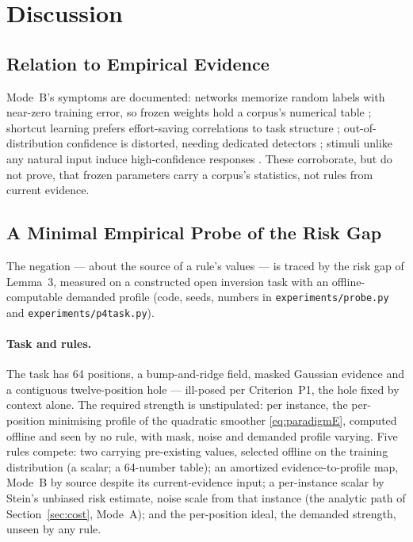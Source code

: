 \section{Discussion}
\label{ch:discussion}

\subsection{Relation to Empirical Evidence}

Mode~B's symptoms are documented: networks memorize random labels with near-zero training error, so frozen weights hold a corpus's numerical table \citep{zhang2021}; shortcut learning prefers effort-saving correlations to task structure \citep{geirhos2020}; out-of-distribution confidence is distorted, needing dedicated detectors \citep{hendrycks2016,yang2024}; stimuli unlike any natural input induce high-confidence responses \citep{nguyen2014}. These corroborate, but do not prove, that frozen parameters carry a corpus's statistics, not rules from current evidence.

\subsection{A Minimal Empirical Probe of the Risk Gap}
\label{sec:probe}

The negation --- about the source of a rule's values --- is traced by the risk gap of Lemma~3, measured on a constructed open inversion task with an offline-computable demanded profile (code, seeds, numbers in \texttt{experiments/probe.py} and \texttt{experiments/p4\ttu task.py}).

\paragraph{Task and rules.} The task has 64 positions, a bump-and-ridge field, masked Gaussian evidence and a contiguous twelve-position hole --- ill-posed per Criterion~P1, the hole fixed by context alone. The required strength is unstipulated: per instance, the per-position minimising profile of the quadratic smoother \eqref{eq:paradigmE}, computed offline and seen by no rule, with mask, noise and demanded profile varying. Five rules compete: two carrying pre-existing values, selected offline on the training distribution (a scalar; a 64-number table); an amortized evidence-to-profile map, Mode~B by source despite its current-evidence input; a per-instance scalar by Stein's unbiased risk estimate, noise scale from that instance (the analytic path of Section~\ref{sec:cost}, Mode~A); and the per-position ideal, the demanded strength, unseen by any rule.

